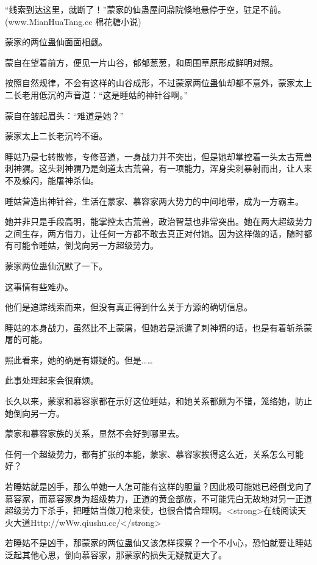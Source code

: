
\begin{this_body}

“线索到达这里，就断了！”蒙家的仙蛊屋问鼎院倏地悬停于空，驻足不前。(www.MianHuaTang.cc 棉花糖小说)

蒙家的两位蛊仙面面相觑。

蒙自在望着前方，便见一片山谷，郁郁葱葱，和周围草原形成鲜明对照。

按照自然规律，不会有这样的山谷成形，不过蒙家两位蛊仙却都不意外，蒙家太上二长老用低沉的声音道：“这是睡姑的神针谷啊。”

蒙自在皱起眉头：“难道是她？”

蒙家太上二长老沉吟不语。

睡姑乃是七转散修，专修音道，一身战力并不突出，但是她却掌控着一头太古荒兽刺神猬。这头刺神猬乃是剑道太古荒兽，有一项能力，浑身尖刺暴射而出，让人来不及躲闪，能屠神杀仙。

睡姑营造出神针谷，生活在蒙家、慕容家两大势力的中间地带，成为一方霸主。

她并非只是手段高明，能掌控太古荒兽，政治智慧也非常突出。她在两大超级势力之间生存，两方借力，让任何一方都不敢去真正对付她。因为这样做的话，随时都有可能令睡姑，倒戈向另一方超级势力。

蒙家两位蛊仙沉默了一下。

这事情有些难办。

他们是追踪线索而来，但没有真正得到什么关于方源的确切信息。

睡姑的本身战力，虽然比不上蒙屠，但她若是派遣了刺神猬的话，也是有着斩杀蒙屠的可能。

照此看来，她的确是有嫌疑的。但是……

此事处理起来会很麻烦。

长久以来，蒙家和慕容家都在示好这位睡姑，和她关系都颇为不错，笼络她，防止她倒向另一方。

蒙家和慕容家族的关系，显然不会好到哪里去。

任何一个超级势力，都有扩张的本能，蒙家、慕容家挨得这么近，关系怎么可能好？

若睡姑就是凶手，那么单她一人怎可能有这样的胆量？因此极可能她已经倒戈向了慕容家，而慕容家身为超级势力，正道的黄金部族，不可能凭白无故地对另一正道超级势力下杀手，把睡姑当做刀枪来使，也很合情合理啊。<strong>在线阅读天火大道Http://wWw.qiushu.cc/</strong>

若睡姑不是凶手，那蒙家的两位蛊仙又该怎样探察？一个不小心，恐怕就要让睡姑泛起其他心思，倒向慕容家，那蒙家的损失无疑就更大了。


\end{this_body}
